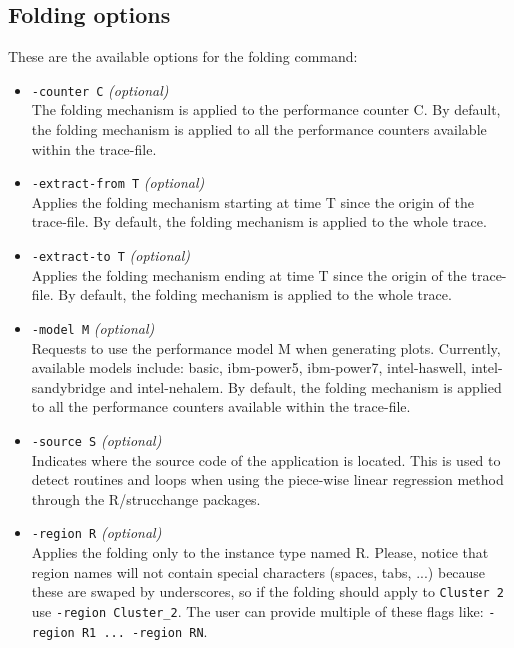 

\subsection{Folding options}

These are the available options for the folding command:

\begin{itemize}

	\item \texttt{-counter C} \textit{(optional)}\\
	The folding mechanism is applied to the performance counter C. By default, the folding mechanism is applied to all the performance counters available within the trace-file.

	\item \texttt{-extract-from T} \textit{(optional)}\\
	Applies the folding mechanism starting at time T since the origin of the trace-file. By default, the folding mechanism is applied to the whole trace.

	\item \texttt{-extract-to T} \textit{(optional)}\\
	Applies the folding mechanism ending at time T since the origin of the trace-file. By default, the folding mechanism is applied to the whole trace.

	\item \texttt{-model M} \textit{(optional)}\\
	Requests to use the performance model M when generating plots. Currently, available models include: basic, ibm-power5, ibm-power7, intel-haswell, intel-sandybridge and intel-nehalem. By default, the folding mechanism is applied to all the performance counters available within the trace-file.

	\item \texttt{-source S} \textit{(optional)}\\
	Indicates where the source code of the application is located. This is used to detect routines and loops when using the piece-wise linear regression method through the R/strucchange packages.

	\item \texttt{-region R} \textit{(optional)}\\
	Applies the folding only to the instance type named R. Please, notice that region names will not contain special characters (spaces, tabs, ...) because these are swaped by underscores, so if the folding should apply to \texttt{Cluster 2} use \texttt{-region Cluster\_2}. The user can provide multiple of these flags like: \texttt{-region R1 ... -region RN}.


\end{itemize}
